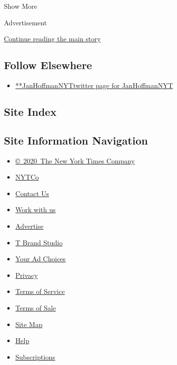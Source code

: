 Show More

Advertisement

\protect\hyperlink{after-mid2}{Continue reading the main story}

\hypertarget{follow-elsewhere}{%
\subsection{Follow Elsewhere}\label{follow-elsewhere}}

\begin{itemize}
\tightlist
\item
  \href{https://twitter.com/JanHoffmanNYT}{**JanHoffmanNYTtwitter page
  for JanHoffmanNYT}
\end{itemize}

\hypertarget{site-index}{%
\subsection{Site Index}\label{site-index}}

\hypertarget{site-information-navigation}{%
\subsection{Site Information
Navigation}\label{site-information-navigation}}

\begin{itemize}
\tightlist
\item
  \href{https://help.nytimes3xbfgragh.onion/hc/en-us/articles/115014792127-Copyright-notice}{©~2020~The
  New York Times Company}
\end{itemize}

\begin{itemize}
\tightlist
\item
  \href{https://www.nytco.com/}{NYTCo}
\item
  \href{https://help.nytimes3xbfgragh.onion/hc/en-us/articles/115015385887-Contact-Us}{Contact
  Us}
\item
  \href{https://www.nytco.com/careers/}{Work with us}
\item
  \href{https://nytmediakit.com/}{Advertise}
\item
  \href{http://www.tbrandstudio.com/}{T Brand Studio}
\item
  \href{https://www.nytimes3xbfgragh.onion/privacy/cookie-policy\#how-do-i-manage-trackers}{Your
  Ad Choices}
\item
  \href{https://www.nytimes3xbfgragh.onion/privacy}{Privacy}
\item
  \href{https://help.nytimes3xbfgragh.onion/hc/en-us/articles/115014893428-Terms-of-service}{Terms
  of Service}
\item
  \href{https://help.nytimes3xbfgragh.onion/hc/en-us/articles/115014893968-Terms-of-sale}{Terms
  of Sale}
\item
  \href{https://spiderbites.nytimes3xbfgragh.onion}{Site Map}
\item
  \href{https://help.nytimes3xbfgragh.onion/hc/en-us}{Help}
\item
  \href{https://www.nytimes3xbfgragh.onion/subscription?campaignId=37WXW}{Subscriptions}
\end{itemize}
